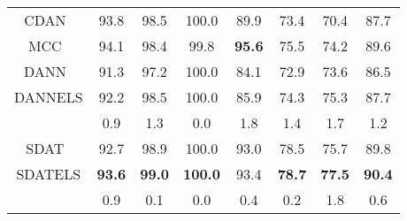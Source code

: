 \documentclass{article} \usepackage{iclr2023_conference,times}
\newcommand{\Gray}[0]{\rowcolor{gray!20}}
\begin{document}
\begin{table}[]
\begin{tabular}{@{}c|ccccccc@{}}
CDAN~\citep{long2018conditional}        & 93.8           & 98.5           & 100.0          & 89.9           & 73.4           & 70.4           & 87.7         \\
MCC~\citep{MCC}         & 94.1           & 98.4           & 99.8           & \textbf{95.6}           & 75.5           & 74.2           & 89.6         \\
DANN~\citep{ganin2016domain}  & 91.3 & 97.2 & 100.0 & 84.1 & 72.9 & 73.6 & 86.5 \\\Gray
DANNELS & 92.2 & 98.5 & 100.0 & 85.9 & 74.3 & 75.3 & 87.7 \\\Gray
 & 0.9 & 1.3 & 0.0 & 1.8 & 1.4 & 1.7 & 1.2 \\
SDAT~\citep{rangwani2022closer}        & 92.7           & 98.9           & 100.0          & 93.0           & 78.5           & 75.7           & 89.8         \\\Gray
SDATELS  &\textbf{93.6}        & \textbf{99.0} & \textbf{100.0} & {93.4} & \textbf{78.7} & \textbf{77.5} & \textbf{90.4}               \\\Gray
 & 0.9          & 0.1         & 0.0 & 0.4 & 0.2 & 1.8 & 0.6              \\
\bottomrule
\end{tabular}\end{table}
\end{document}
